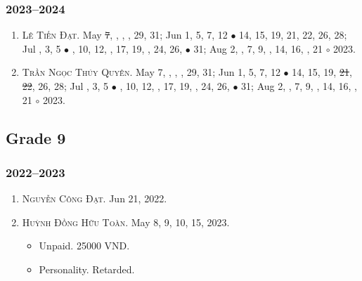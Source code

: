 \documentclass{article}
\begin{document}
\subsubsection{2023--2024}

\begin{enumerate}
	\item \textsc{Lê Tiến Đạt.} May \st{7}, , , , 29, 31; Jun 1, 5, 7, 12 $\bullet$ 14, 15, 19, 21, 22, 26, 28; Jul , 3, 5 $\bullet$ , 10, 12, , 17, 19, , 24, 26,  $\bullet$ 31; Aug 2, , 7, 9, , 14, 16, , 21 $\circ$ 2023.
	\item \textsc{Trần Ngọc Thúy Quyên.} May 7, , , , 29, 31; Jun 1, 5, 7, 12 $\bullet$ 14, 15, 19, \st{21}, \st{22}, 26, 28; Jul , 3, 5 $\bullet$ , 10, 12, , 17, 19, , 24, 26,  $\bullet$ 31; Aug 2, , 7, 9, , 14, 16, , 21 $\circ$ 2023.
\end{enumerate}


\subsection{Grade 9}

\subsubsection{2022--2023}

\begin{enumerate}
	\item \textsc{Nguyễn Công Đạt.} {\sf[In]} Jun 21, 2022. {\sf[Out]}
	\item \textsc{Huỳnh Đồng Hữu Toàn.} {\sf[In]} May 8, 9, 10, 15, 2023. {\sf[Out]}
	\begin{itemize}
		\item {\sf Unpaid.} 25000 VND.
		\item {\sf Personality.} Retarded.
	\end{itemize}
\end{enumerate}
\end{document}
